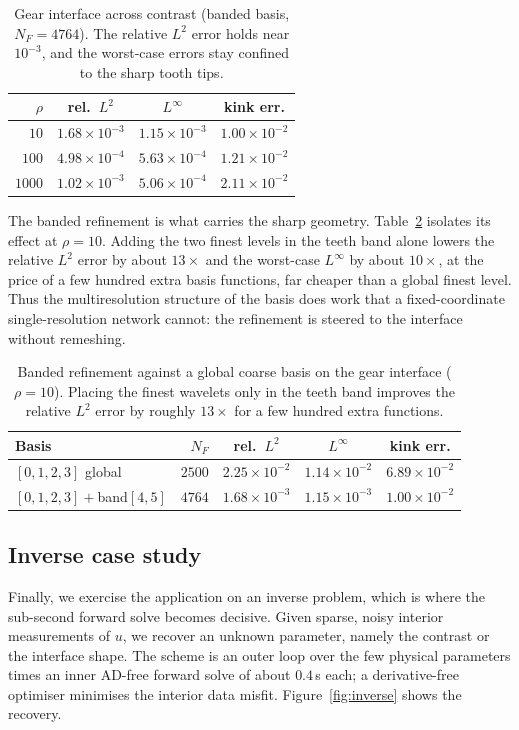 \documentclass[preprint,12pt,authoryear]{elsarticle}
\begin{document}
\begin{table}[t]
\centering
\begin{tabular}{r c c c}
\hline
$\rho$ & rel.\ $L^2$ & $L^\infty$ & kink err. \\
\hline
$10$    & $1.68\times10^{-3}$ & $1.15\times10^{-3}$ & $1.00\times10^{-2}$ \\
$100$   & $4.98\times10^{-4}$ & $5.63\times10^{-4}$ & $1.21\times10^{-2}$ \\
$1000$  & $1.02\times10^{-3}$ & $5.06\times10^{-4}$ & $2.11\times10^{-2}$ \\
\hline
\end{tabular}
\caption{Gear interface across contrast (banded basis, $N_F=4764$). The relative $L^2$ error holds near $10^{-3}$, and the worst-case errors stay confined to the sharp tooth tips.}
\label{tab:gear-contrast}
\end{table}

The banded refinement is what carries the sharp geometry. Table~\ref{tab:gear-band} isolates its effect at $\rho=10$. Adding the two finest levels in the teeth band alone lowers the relative $L^2$ error by about $13\times$ and the worst-case $L^\infty$ by about $10\times$, at the price of a few hundred extra basis functions, far cheaper than a global finest level. Thus the multiresolution structure of the basis does work that a fixed-coordinate single-resolution network cannot: the refinement is steered to the interface without remeshing.

\begin{table}[t]
\centering
\begin{tabular}{l r c c c}
\hline
Basis & $N_F$ & rel.\ $L^2$ & $L^\infty$ & kink err. \\
\hline
$[0,1,2,3]$ global & $2500$ & $2.25\times10^{-2}$ & $1.14\times10^{-2}$ & $6.89\times10^{-2}$ \\
$[0,1,2,3]+$band$[4,5]$ & $4764$ & $1.68\times10^{-3}$ & $1.15\times10^{-3}$ & $1.00\times10^{-2}$ \\
\hline
\end{tabular}
\caption{Banded refinement against a global coarse basis on the gear interface ($\rho=10$). Placing the finest wavelets only in the teeth band improves the relative $L^2$ error by roughly $13\times$ for a few hundred extra functions.}
\label{tab:gear-band}
\end{table}

\subsection{Inverse case study}
\label{subsec:inverse}
Finally, we exercise the application on an inverse problem, which is where the sub-second forward solve becomes decisive. Given sparse, noisy interior measurements of $u$, we recover an unknown parameter, namely the contrast or the interface shape. The scheme is an outer loop over the few physical parameters times an inner AD-free forward solve of about $0.4$\,s each; a derivative-free optimiser minimises the interior data misfit. Figure~\ref{fig:inverse} shows the recovery.
\end{document}

